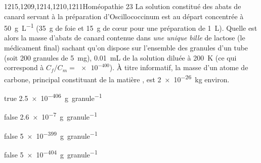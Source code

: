 			\begin{question}{1215,1209,1214,1210,1211}{Homéopathie 2}{3}{}
				La solution constitué des abats de canard servant à la préparation d'Oscillococcinum est au départ concentrée à \SI{50}{\gram\per\liter} (\SI{35}{\gram} de foie et \SI{15}{\gram} de c\oe{}ur pour une préparation de \SI{1}{\liter}). Quelle est alors la masse d'abats de canard contenue dans \emph{une unique bille} de lactose (le médicament final) sachant qu'on dispose sur l'ensemble des granules d'un tube (soit 200 granules de \SI{5}{\milli\gram}), \SI{0.01}{\milli\liter} de la solution diluée à \SI{200}{K} (ce qui correspond à $C_f/C_m = \num{e-400}$). À titre informatif, la masse d'un atome de carbone, principal constituant de la matière , est \SI{2e-26}{\kilo\gram} environ.
			\end{question}
			\begin{reponses} 
				\item[true] \SI{2.5e-406}{\gram\per granule}
				\item[false] \SI{2.6e-7}{\gram\per granule}
				\item[false] \SI{5e-399}{\gram\per granule}
				\item[false] \SI{5e-404}{\gram\per granule}
			\end{reponses}
